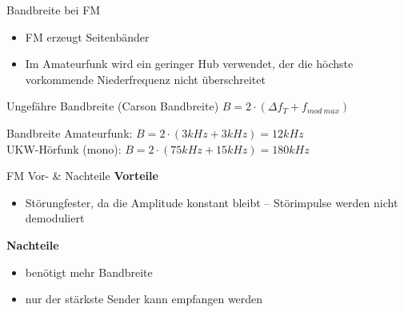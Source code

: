 \begin{frame}{Bandbreite bei FM}
  \begin{itemize}
    \item FM erzeugt Seitenbänder
    \item Im Amateurfunk wird ein geringer Hub verwendet, der die höchste vorkommende Niederfrequenz nicht überschreitet
  \end{itemize}
  \begin{block}{Ungefähre Bandbreite (Carson Bandbreite)}
    $B = 2 \cdot (\Delta f_T + f_{mod~max})$
  \end{block}
  \begin{exampleblock}{Bandbreite}
    Amateurfunk: $B =2 \cdot (3kHz + 3kHz) = 12kHz$\\
    UKW-Hörfunk (mono): $B = 2 \cdot (75kHz + 15kHz) = 180kHz$
  \end{exampleblock}
\end{frame}

\begin{frame}{FM Vor- \& Nachteile}
\textbf{\Large{Vorteile}}
\begin{itemize}
    \item Störungfester, da die Amplitude konstant bleibt -- Störimpulse werden
          nicht demoduliert
\end{itemize}
\vspace{1cm}
\textbf{\Large{Nachteile}}
\begin{itemize}
    \item benötigt mehr Bandbreite
    \item nur der stärkste Sender kann empfangen werden
\end{itemize}
\end{frame}


